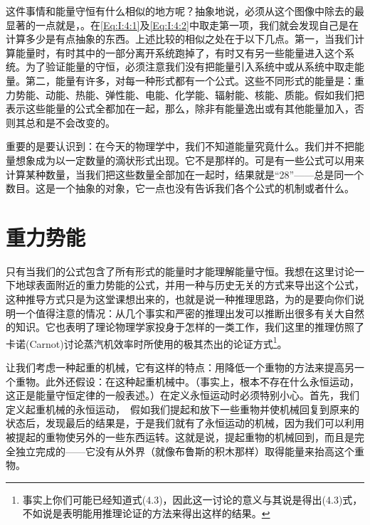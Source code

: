 \documentclass[12pt,oneside]{book}
\begin{document}
这件事情和能量守恒有什么相似的地方呢？抽象地说，必须从这个图像中除去的最显著的一点就是，。在\eqref{Eq:I:4:1}及\eqref{Eq:I:4:2}中取走第一项，我们就会发现自己是在计算多少是有点抽象的东西。上述比较的相似之处在于以下几点。第一，当我们计算能量时，有时其中的一部分离开系统跑掉了，有时又有另一些能量进入这个系统。为了验证能量的守恒，必须注意我们没有把能量引入系统中或从系统中取走能量。第二，能量有许多，对每一种形式都有一个公式。这些不同形式的能量是：重力势能、动能、热能、弹性能、电能、化学能、辐射能、核能、质能。假如我们把表示这些能量的公式全都加在一起，那么，除非有能量逸出或有其他能量加入，否则其总和是不会改变的。

重要的是要认识到：在今天的物理学中，我们不知道能量究竟什么。我们并不把能量想象成为以一定数量的滴状形式出现。它不是那样的。可是有一些公式可以用来计算某种数量，当我们把这些数量全部加在一起时，结果就是“28”——总是同一个数目。这是一个抽象的对象，它一点也没有告诉我们各个公式的机制或者什么。


\section{重力势能}
只有当我们的公式包含了所有形式的能量时才能理解能量守恒。我想在这里讨论一下地球表面附近的重力势能的公式，并用一种与历史无关的方式来导出这个公式，这种推导方式只是为这堂课想出来的，也就是说一种推理思路，为的是要向你们说明一个值得注意的情况：从几个事实和严密的推理出发可以推断出很多有关大自然的知识。它也表明了理论物理学家投身于怎样的一类工作，我们这里的推理仿照了卡诺(Carnot)讨论蒸汽机效率时所使用的极其杰出的论证方式\footnote{事实上你们可能已经知道式(4.3)，因此这一讨论的意义与其说是得出(4.3)式，不如说是表明能用推理论证的方法来得出这样的结果。}。

让我们考虑一种起重的机械，它有这样的特点：用降低一个重物的方法来提高另一个重物。此外还假设：在这种起重机械中。（事实上，根本不存在什么永恒运动，这正是能量守恒定律的一般表述。）在定义永恒运动时必须特别小心。首先，我们定义起重机械的永恒运动，　假如我们提起和放下一些重物并使机械回复到原来的状态后，发现最后的结果是，于是我们就有了永恒运动的机械，因为我们可以利用被提起的重物使另外的一些东西运转。这就是说，提起重物的机械回到，而且是完全独立完成的——它没有从外界（就像布鲁斯的积木那样）取得能量来抬高这个重物。
\end{document}
